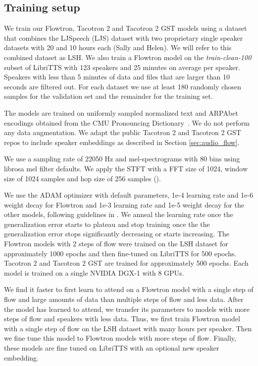 \documentclass{article}
\begin{document}
\subsection{Training setup}
We train our Flowtron, Tacotron 2 and Tacotron 2 GST models using a dataset that combines the LJSpeech (LJS) dataset \cite{ito2017lj} with two proprietary single speaker datasets with 20 and 10 hours each (Sally and Helen). We will refer to this combined dataset as LSH. We also train a Flowtron model on the \textit{train-clean-100} subset of LibriTTS \cite{zen2019libritts} with 123 speakers and 25 minutes on average per speaker. Speakers with less than 5 minutes of data and files that are larger than 10 seconds are filtered out. For each dataset we use at least 180 randomly chosen samples for the validation set and the remainder for the training set. 

The models are trained on uniformly sampled normalized text and ARPAbet encodings obtained from the CMU Pronouncing Dictionary~\cite{weide1998cmu}. We do not perform any data augmentation. We adapt the public Tacotron 2 and Tacotron 2 GST repos to include speaker embeddings as described in Section \ref{sec:audio_flow}.


We use a sampling rate of 22050 Hz and mel-spectrograms with 80 bins using librosa mel filter defaults. We apply the STFT with a FFT size of 1024, window size of 1024 samples and hop size of 256 samples ().

We use the ADAM \cite{kingma2014adam} optimizer with default parameters, 1e-4 learning rate and 1e-6 weight decay for Flowtron and 1e-3 learning rate and 1e-5 weight decay for the other models, following guidelines in \cite{wang2017tacotron}. We anneal the learning rate once the generalization error starts to plateau and stop training once the the generalization error stops significantly decreasing or starts increasing. The Flowtron models with 2 steps of flow were trained on the LSH dataset for approximately 1000 epochs and then fine-tuned on LibriTTS for 500 epochs. Tacotron 2 and Tacotron 2 GST are trained for approximately 500 epochs. Each model is trained on a single NVIDIA DGX-1 with 8 GPUs.

We find it faster to first learn to attend on a Flowtron model with a single step of flow and large amounts of data than multiple steps of flow and less data. After the model has learned to attend, we transfer its parameters to models with more steps of flow and  speakers with less data. Thus, we first train Flowtron model with a single step of flow on the LSH dataset with many hours per speaker. Then we fine tune this model to Flowtron models with more steps of flow. Finally, these models are fine tuned on LibriTTS with an optional new speaker embedding.
\end{document}
